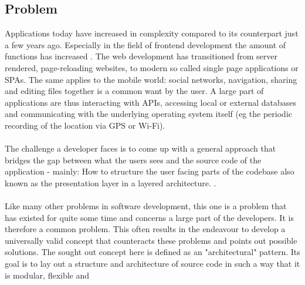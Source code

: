 \subsection{Problem}
\label{subsec:problem}


Applications today have increased in complexity compared to its counterpart just a few years ago. Especially in the field of frontend development the amount of 
functions has increased
\cite{increasingNatureOfFrontendKevinBall2018}. 
The web development has transitioned from server rendered, 
page-reloading websites, to modern so called single page applications or SPAs.
The same applies to the mobile world: social networks, navigation, sharing and editing files together is a common want by the user.
A large part of applications are thus interacting with APIs, accessing local or external databases
and communicating with the underlying operating system itself (eg the periodic recording of the location via GPS or Wi-Fi).
\\
\\
The challenge a developer faces is to come up with a general approach that bridges the gap between what the users sees and the source code of 
the application - mainly: How to structure the user facing parts of the codebase also known as the presentation layer
\cite{patternsOfEnterpriseApplicationArchitectureMartinFowlerPresentationLayer,softwareArchitecturePatternMarkRichards2015PresentationLayer} 
in a layered architecture.
\cite{threeTierArchitectureDonaldWolfe2013}.
\\
\\
Like many other problems in software development, this one is a problem that has existed for quite some time and concerns a large part of the developers.
It is therefore a common problem. This often results in the endeavour to develop a universally valid concept that counteracts these problems and points out 
possible solutions. The sought out concept here is defined as an "architectural" pattern.
\cite{softwareArchitecturePatternMarkRichards2015, patternOrientedSoftwareArchitectureFrankBuschmann2007, designPatternElementsOfErichGamma2000}
Its goal is to lay out a structure and architecture of source code in such a way that it is modular, flexible and
